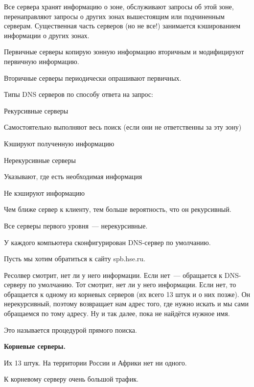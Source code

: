 Все сервера хранят информацию о зоне, обслуживают запросы об этой зоне, перенаправляют запросы о других зонах вышестоящим или подчиненным серверам. Существенная часть серверов (но не все!) занимается кэшированием информации о других зонах.

Первичные серверы копирую зонную информацию вторичным и модифицируют первичную информацию.

Вторичные серверы периодически опрашивают первичных.

Типы DNS серверов по способу ответа на запрос:
\begin{MyItemize}
    \item Рекурсивные серверы
    \begin{MyItemize}
        \item Самостоятельно выполняют весь поиск (если они не ответственны за эту зону)
        \item Кэшируют полученную информацию
    \end{MyItemize}
    \item Нерекурсивные серверы
    \begin{MyItemize}
        \item Указывают, где есть необходимая информация
        \item Не кэшируют информацию
    \end{MyItemize}
\end{MyItemize}

Чем ближе сервер к клиенту, тем больше вероятность, что он рекурсивный.

Все серверы первого уровня~--- нерекурсивные.

У каждого компьютера сконфигурирован DNS-сервер по умолчанию.

Пусть мы хотим обратиться к сайту spb.hse.ru.

Ресолвер смотрит, нет ли у него информации. Если нет~--- обращается к DNS-серверу по умолчанию. Тот смотрит, нет ли у него информации. Если нет, то обращается к одному из корневых серверов (их всего 13 штук и о них позже). Он нерекурсивный, поэтому возвращает нам адрес того, где нужно искать и мы сами обращаемся по тому адресу. Ну и так далее, пока не найдётся нужное имя.

Это называется процедурой прямого поиска.

{\bf Корневые серверы.}

Их 13 штук. На территории России и Африки нет ни одного.

К корневому серверу очень большой трафик.

